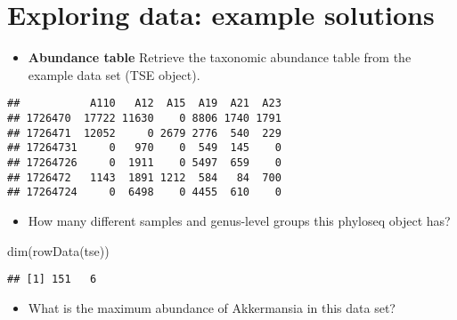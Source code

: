 \documentclass[
  oneside]{book}
\newenvironment{Shaded}{\begin{snugshade}}{\end{snugshade}}
\newcommand{\CommentTok}[1]{\textcolor[rgb]{0.56,0.35,0.01}{\textit{#1}}}
\newcommand{\DecValTok}[1]{\textcolor[rgb]{0.00,0.00,0.81}{#1}}
\newcommand{\FunctionTok}[1]{\textcolor[rgb]{0.00,0.00,0.00}{#1}}
\newcommand{\NormalTok}[1]{#1}
\newcommand{\SpecialCharTok}[1]{\textcolor[rgb]{0.00,0.00,0.00}{#1}}
\providecommand{\tightlist}{%
  \setlength{\itemsep}{0pt}\setlength{\parskip}{0pt}}
\begin{document}
\hypertarget{exploring-data-example-solutions}{%
\section{Exploring data: example solutions}\label{exploring-data-example-solutions}}

\begin{itemize}
\tightlist
\item
  \textbf{Abundance table} Retrieve the taxonomic abundance table from the
  example data set (TSE object).
\end{itemize}

\begin{Shaded}
\end{Shaded}

\begin{verbatim}
##           A110   A12  A15  A19  A21  A23
## 1726470  17722 11630    0 8806 1740 1791
## 1726471  12052     0 2679 2776  540  229
## 17264731     0   970    0  549  145    0
## 17264726     0  1911    0 5497  659    0
## 1726472   1143  1891 1212  584   84  700
## 17264724     0  6498    0 4455  610    0
\end{verbatim}

\begin{itemize}
\tightlist
\item
  How many different samples and genus-level groups this phyloseq
  object has?
\end{itemize}

\begin{Shaded}
\begin{Highlighting}[]
\FunctionTok{dim}\NormalTok{(}\FunctionTok{rowData}\NormalTok{(tse))}
\end{Highlighting}
\end{Shaded}

\begin{verbatim}
## [1] 151   6
\end{verbatim}

\begin{itemize}
\tightlist
\item
  What is the maximum abundance of Akkermansia in this data set?
\end{itemize}
\end{document}

